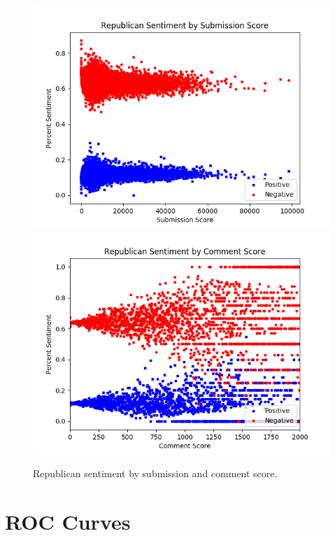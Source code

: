 \documentclass[12pt]{article}
\begin{document}
\begin{figure}[H]
                  \includegraphics[width=\linewidth]{plot5a_rep_sentiment_by_story.png}
        \endminipage\hfill
                  \includegraphics[width=\linewidth]{plot5b_rep_sentiment_by_comment.png}
        \endminipage
        \caption{Republican sentiment by submission and comment score.}
\end{figure}

\section{ROC Curves}
\end{document}
